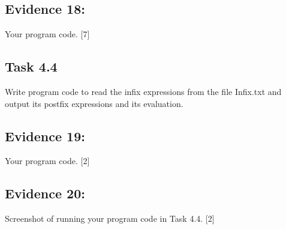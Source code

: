 \subsection*{Evidence 18: }

Your program code.\hfill{} {[}7{]} 

\subsection*{Task 4.4}

Write program code to read the infix expressions from the file Infix.txt
and output its postfix expressions and its evaluation. 

\subsection*{Evidence 19: }

Your program code. \hfill{}{[}2{]}

\subsection*{Evidence 20: }

Screenshot of running your program code in Task 4.4.\hfill{} {[}2{]}